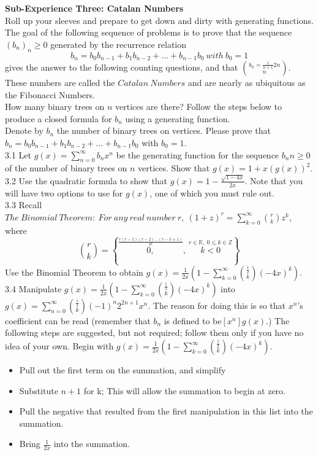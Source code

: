 \documentclass[10pt,a4paper]{report}
\begin{document}
	\textbf{Sub-Experience Three: Catalan Numbers}\\
	Roll up your sleeves and prepare to get down and dirty with generating functions.  The goal of the following sequence of problems is to prove that the sequence $(b_n)_n\geq0$ generated by the recurrence relation\\
	\[b_n = b_0b_{n-1} + b_1b_{n-2} + ... + b_{n-1}b_0\ with\ b_0 = 1\]
	gives the answer to the following counting questions, and that $b_n = \frac{1}{n+1}{2n}\choose{n}$.  These numbers are called the $Catalan\ Numbers$ and are nearly as ubiquitous as the Fibonacci Numbers.\\
	\newline
	How many binary trees on $n$ vertices are there?  Follow the steps below to produce a closed formula for $b_n$ using a generating function.\\
	 Denote by $b_n$ the number of binary trees on vertices.  Please prove that $b_n = b_0b_{n-1} + b_1b_{n-2} + ... + b_{n-1}b_0$ with $b_0 = 1$.\\
	3.1 Let $g(x) = \sum_{n=0}^{\infty}b_nx^n$ be the generating function for the sequence $b_n n\geq0$ of the number of binary trees on $n$ vertices.  Show that $g(x) = 1+x(g(x))^2$.\\
	3.2 Use the quadratic formula to show that $g(x) = 1-\frac{\sqrt{1-4x}}{2x}$. Note that you will have two options to use for $g(x)$, one of which you must rule out.\\
	3.3 Recall $The\ Binomial\ Theorem:\ For\ any\ real\ number\ r,\ (1+z)^r = \sum_{k=0}^{\infty}\binom{r}{k}z^k$, where 
	\[\binom{r}{k} = \left \lbrace \overset{\frac{r(r-1)(r-2)...(r-k+1)}{k!}}{0,},\ \overset{r\in\mathbb{R},\ 0\leq k\in\mathbb{Z}}{k<0} \right \rbrace \]
	Use the Binomial Theorem to obtain $g(x) = \frac{1}{2x}(1-\sum_{k=0}^{\infty}\binom{\frac{1}{2}}{k}(-4x)^k)$.\\
	3.4 Manipulate $g(x) = \frac{1}{2x}(1-\sum_{k=0}^{\infty}\binom{\frac{1}{2}}{k}(-4x)^k)$ into $g(x) = \sum_{n=0}^{\infty}\binom{\frac{1}{2}}{k}(-1)^n2^{2n+1}x^n$.  The reason for doing this is so that $x^n$'s coefficient can be read (remember that $b_n$ is defined to be$ [x^n]g(x)$.)  The following steps are suggested, but not required; follow them only if you have no idea of your own.  Begin with $g(x) = \frac{1}{2x}(1-\sum_{k=0}^{\infty}\binom{\frac{1}{2}}{k}(-4x)^k)$.\\
	\begin{itemize}
		\item Pull out the first term on the summation,  and simplify
		\item Substitute $n+1$ for k;  This will allow the summation to begin at zero.
		\item Pull the negative that resulted from the first manipulation in this list into the summation. 
		\item Bring $\frac{1}{2x}$ into the summation.\\
	\end{itemize}
	
\end{document}

